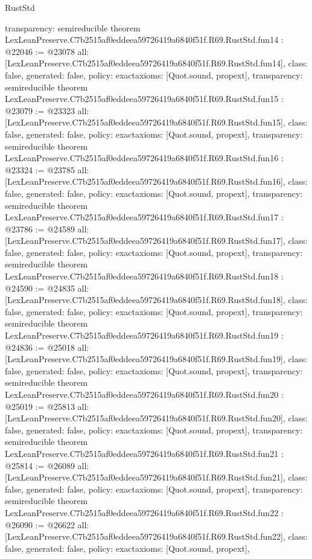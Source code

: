 \begin{lexlean}{RustStd}
\begin{coremodule}
{  transparency: semireducible
}
theorem LexLeanPreserve.C7b2515af0eddeea59726419a6840f51f.R69.RustStd.fun14 : @22046 := @23078 {
  all: [LexLeanPreserve.C7b2515af0eddeea59726419a6840f51f.R69.RustStd.fun14],
  class: false,
  generated: false,
  policy: exact{axioms: [Quot.sound, propext]},
  transparency: semireducible
}
theorem LexLeanPreserve.C7b2515af0eddeea59726419a6840f51f.R69.RustStd.fun15 : @23079 := @23323 {
  all: [LexLeanPreserve.C7b2515af0eddeea59726419a6840f51f.R69.RustStd.fun15],
  class: false,
  generated: false,
  policy: exact{axioms: [Quot.sound, propext]},
  transparency: semireducible
}
theorem LexLeanPreserve.C7b2515af0eddeea59726419a6840f51f.R69.RustStd.fun16 : @23324 := @23785 {
  all: [LexLeanPreserve.C7b2515af0eddeea59726419a6840f51f.R69.RustStd.fun16],
  class: false,
  generated: false,
  policy: exact{axioms: [Quot.sound, propext]},
  transparency: semireducible
}
theorem LexLeanPreserve.C7b2515af0eddeea59726419a6840f51f.R69.RustStd.fun17 : @23786 := @24589 {
  all: [LexLeanPreserve.C7b2515af0eddeea59726419a6840f51f.R69.RustStd.fun17],
  class: false,
  generated: false,
  policy: exact{axioms: [Quot.sound, propext]},
  transparency: semireducible
}
theorem LexLeanPreserve.C7b2515af0eddeea59726419a6840f51f.R69.RustStd.fun18 : @24590 := @24835 {
  all: [LexLeanPreserve.C7b2515af0eddeea59726419a6840f51f.R69.RustStd.fun18],
  class: false,
  generated: false,
  policy: exact{axioms: [Quot.sound, propext]},
  transparency: semireducible
}
theorem LexLeanPreserve.C7b2515af0eddeea59726419a6840f51f.R69.RustStd.fun19 : @24836 := @25018 {
  all: [LexLeanPreserve.C7b2515af0eddeea59726419a6840f51f.R69.RustStd.fun19],
  class: false,
  generated: false,
  policy: exact{axioms: [Quot.sound, propext]},
  transparency: semireducible
}
theorem LexLeanPreserve.C7b2515af0eddeea59726419a6840f51f.R69.RustStd.fun20 : @25019 := @25813 {
  all: [LexLeanPreserve.C7b2515af0eddeea59726419a6840f51f.R69.RustStd.fun20],
  class: false,
  generated: false,
  policy: exact{axioms: [Quot.sound, propext]},
  transparency: semireducible
}
theorem LexLeanPreserve.C7b2515af0eddeea59726419a6840f51f.R69.RustStd.fun21 : @25814 := @26089 {
  all: [LexLeanPreserve.C7b2515af0eddeea59726419a6840f51f.R69.RustStd.fun21],
  class: false,
  generated: false,
  policy: exact{axioms: [Quot.sound, propext]},
  transparency: semireducible
}
theorem LexLeanPreserve.C7b2515af0eddeea59726419a6840f51f.R69.RustStd.fun22 : @26090 := @26622 {
  all: [LexLeanPreserve.C7b2515af0eddeea59726419a6840f51f.R69.RustStd.fun22],
  class: false,
  generated: false,
  policy: exact{axioms: [Quot.sound, propext]},
}
\end{coremodule}
\end{lexlean}
